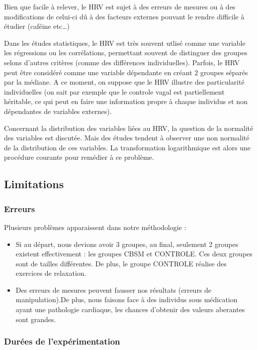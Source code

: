 \documentclass[]{article}
\providecommand{\tightlist}{%
  \setlength{\itemsep}{0pt}\setlength{\parskip}{0pt}}
\begin{document}
Bien que facile à relever, le HRV est sujet à des erreurs de mesures ou
à des modifications de celui-ci dû à des facteurs externes pouvant le
rendre difficile à étudier (caféine etc\ldots{})

Dans les études statistiques, le HRV est très souvent utlisé comme une
variable les régressions ou les corrélations, permettant souvent de
distinguer des groupes selons d'autres critères (comme des différences
individuelles). Parfois, le HRV peut être considéré comme une variable
dépendante en créant 2 groupes séparés par la médiane. A ce moment, on
suppose que le HRV illustre des particularité individuelles (on sait par
exemple que le controle vagal est partiellement héritable, ce qui peut
en faire une information propre à chaque individus et non dépendantes de
variables externes).

Concernant la distribution des variables liées au HRV, la question de la
normalité des variables est discutée. Mais des études tendent à observer
une non normalité de la distribution de ces variables. La transformation
logarithmique est alors une procédure courante pour remédier à ce
problème.

\hypertarget{limitations}{%
\subsection{Limitations}\label{limitations}}

\hypertarget{erreurs}{%
\subsubsection{Erreurs}\label{erreurs}}

Plusieurs problèmes apparaissent dans notre méthodologie :

\begin{itemize}
\tightlist
\item
  Si au départ, nous devions avoir 3 groupes, au final, seulement 2
  groupes existent effectivement : les groupes CBSM et CONTROLE. Ces
  deux groupes sont de tailles différentes. De plus, le groupe CONTROLE
  réalise des exercices de relaxation.
\item
  Des erreurs de mesures peuvent fausser nos résultats (erreurs de
  manipulation).De plus, nous faisons face à des individus sous
  médication ayant une pathologie cardiaque, les chances d'obtenir des
  valeurs aberantes sont grandes.
\end{itemize}

\hypertarget{duruxe9es-de-lexpuxe9rimentation}{%
\subsubsection{Durées de
l'expérimentation}\label{duruxe9es-de-lexpuxe9rimentation}}
\end{document}

